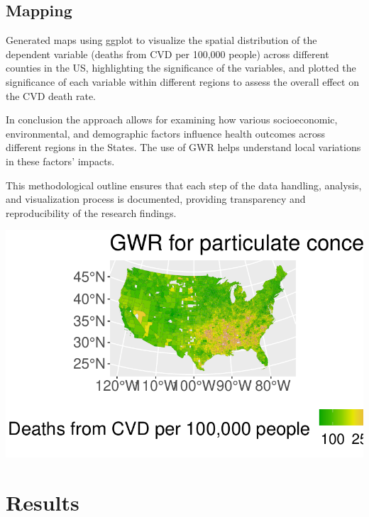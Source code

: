 \documentclass[
]{article}
\begin{document}
\subsection{Mapping}\label{mapping}

Generated maps using ggplot to visualize the spatial distribution of the
dependent variable (deaths from CVD per 100,000 people) across different
counties in the US, highlighting the significance of the variables, and
plotted the significance of each variable within different regions to
assess the overall effect on the CVD death rate.

In conclusion the approach allows for examining how various
socioeconomic, environmental, and demographic factors influence health
outcomes across different regions in the States. The use of GWR helps
understand local variations in these factors' impacts.

This methodological outline ensures that each step of the data handling,
analysis, and visualization process is documented, providing
transparency and reproducibility of the research findings.

\includegraphics{report_files/figure-pdf/unnamed-chunk-2-1.pdf}

\section{Results}\label{results}
\end{document}

